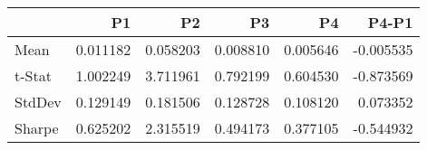 \begin{tabular}{lrrrrr}
\toprule
 & P1 & P2 & P3 & P4 & P4-P1 \\
\midrule
Mean & 0.011182 & 0.058203 & 0.008810 & 0.005646 & -0.005535 \\
t-Stat & 1.002249 & 3.711961 & 0.792199 & 0.604530 & -0.873569 \\
StdDev & 0.129149 & 0.181506 & 0.128728 & 0.108120 & 0.073352 \\
Sharpe & 0.625202 & 2.315519 & 0.494173 & 0.377105 & -0.544932 \\
\bottomrule
\end{tabular}
